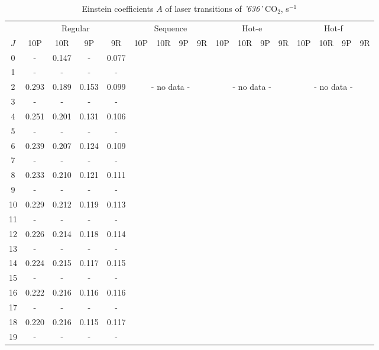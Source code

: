 \documentclass{report}
\begin{document}
\begin{table}
\centering
\caption{Einstein coefficients $A$ of laser transitions of \textit{'636'} CO$_2$, s$^{-1}$}
\scriptsize
\begin{tabular}{|c|cccc|cccc|cccc|cccc|}
\hline
& \multicolumn{4}{c|}{Regular}& \multicolumn{4}{c|}{Sequence}& \multicolumn{4}{c|}{Hot-e}& \multicolumn{4}{c|}{Hot-f}\\
$J$ & 10P & 10R & 9P & 9R & 10P & 10R & 9P & 9R & 10P & 10R & 9P & 9R & 10P & 10R & 9P & 9R\\ 
\hline
0  &   -   & 0.147 &   -   & 0.077 & & & & & & & & & & & &\\
1  &   -   &   -   &   -   &   -   & & & & & & & & & & & &\\
2  & 0.293 & 0.189 & 0.153 & 0.099 & \multicolumn{4}{c|}{- no data -}& \multicolumn{4}{c|}{- no data -}& \multicolumn{4}{c|}{- no data -}\\
3  &   -   &   -   &   -   &   -   & & & & & & & & & & & &\\
4  & 0.251 & 0.201 & 0.131 & 0.106 & & & & & & & & & & & &\\
5  &   -   &   -   &   -   &   -   & & & & & & & & & & & &\\
6  & 0.239 & 0.207 & 0.124 & 0.109 & & & & & & & & & & & &\\
7  &   -   &   -   &   -   &   -   & & & & & & & & & & & &\\
8  & 0.233 & 0.210 & 0.121 & 0.111 & & & & & & & & & & & &\\
9  &   -   &   -   &   -   &   -   & & & & & & & & & & & &\\
10 & 0.229 & 0.212 & 0.119 & 0.113 & & & & & & & & & & & &\\
11 &   -   &   -   &   -   &   -   & & & & & & & & & & & &\\
12 & 0.226 & 0.214 & 0.118 & 0.114 & & & & & & & & & & & &\\
13 &   -   &   -   &   -   &   -   & & & & & & & & & & & &\\
14 & 0.224 & 0.215 & 0.117 & 0.115 & & & & & & & & & & & &\\
15 &   -   &   -   &   -   &   -   & & & & & & & & & & & &\\
16 & 0.222 & 0.216 & 0.116 & 0.116 & & & & & & & & & & & &\\
17 &   -   &   -   &   -   &   -   & & & & & & & & & & & &\\
18 & 0.220 & 0.216 & 0.115 & 0.117 & & & & & & & & & & & &\\
19 &   -   &   -   &   -   &   -   & & & & & & & & & & & &\\

\end{tabular}
\end{table}
\end{document}
